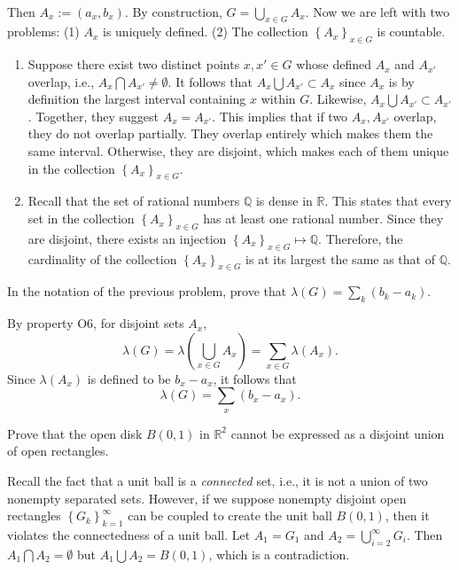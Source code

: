 \documentclass[answers]{exam}
\begin{document}
\begin{questions}
\begin{solution}
\begin{align*}
      \end{align*}
      Then $A_{x} := \left(a_{x}, b_{x}\right)$. By construction, $G = \bigcup_{x\in G} A_{x}$. Now we are left with two problems: (1) $A_{x}$ is uniquely defined. (2) The collection $\left\{A_{x} \right\}_{x\in G}$ is countable.
      \begin{enumerate}
         \item Suppose there exist two distinct points $x,x' \in G$ whose defined $A_{x}$ and $A_{x'}$ overlap, i.e., $A_{x} \bigcap A_{x'} \neq \emptyset$. It follows that $A_{x} \bigcup A_{x'} \subset A_{x}$ since $A_{x}$ is by definition the largest interval containing $x$ within $G$. Likewise, $A_{x} \bigcup A_{x'} \subset A_{x'}$. Together, they suggest $A_{x} = A_{x'}$. This implies that if two $A_{x}, A_{x'}$ overlap, they do not overlap partially. They overlap entirely which makes them the same interval. Otherwise, they are disjoint, which makes each of them unique in the collection $\left\{A_{x} \right\}_{x\in G}$.
         \item Recall that the set of rational numbers $\mathbb{Q}$ is dense in $\mathbb{R}$. This states that every set in the collection $\left\{A_{x} \right\}_{x\in G}$ has at least one rational number. Since they are disjoint, there exists an injection $\left\{A_{x} \right\}_{x\in G} \mapsto \mathbb{Q}$. Therefore, the cardinality of the collection $\left\{A_{x} \right\}_{x\in G}$ is at its largest the same as that of $\mathbb{Q}$. 
      \end{enumerate}
   \end{solution}
   \question
   In the notation of the previous problem, prove that $\lambda\left(G\right) = \sum_{k} \left(b_{k}-a_{k}\right)$.
   \begin{solution}
      By property O6, for disjoint sets $A_{x}$,
      $$
         \lambda\left(G\right) = \lambda\left(\bigcup_{x\in G}A_{x}\right) = \sum_{x\in G}\lambda\left(A_{x}\right).
      $$
      Since $\lambda\left(A_{x}\right)$ is defined to be $b_{x} - a_{x}$, it follows that
      $$
         \lambda\left(G\right) = \sum_{x}\left(b_{x}-a_{x}\right).
      $$
   \end{solution}
   \question
   Prove that the open disk $B\left(0,1\right)$ in $\mathbb{R}^{2}$ cannot be expressed as a disjoint union of open rectangles.
   \begin{solution}
      Recall the fact that a unit ball is a \emph{connected} set, i.e., it is not a union of two nonempty separated sets. However, if we suppose nonempty disjoint open rectangles $\left\{G_{k} \right\}_{k=1}^{\infty}$ can be coupled to create the unit ball $B\left(0,1\right)$, then it violates the connectedness of a unit ball. Let $A_{1} = G_{1}$ and $A_{2} = \bigcup_{i=2}^{\infty} G_{i}$. Then $A_{1} \bigcap A_{2} = \emptyset$ but $A_{1} \bigcup A_{2} = B\left(0,1\right)$, which is a contradiction.
   \end{solution}


\end{questions}
\end{document}

